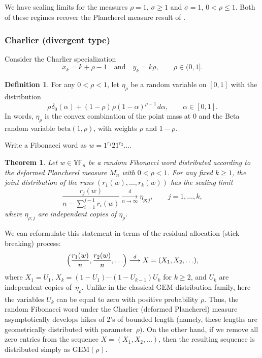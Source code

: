 \documentclass[letterpaper,11pt,oneside,reqno]{article}
\numberwithin{equation}{section}
\newcommand{\ssp}{\hspace{1pt}}
\newtheorem{theorem}[proposition]{Theorem}
\theoremstyle{definition}
\newtheorem{definition}[proposition]{Definition}
\begin{document}
\subsection{}

We have scaling limits for the measures
$\rho=1$, $\sigma\ge1$
and
$\sigma=1$, $0<\rho\le 1$.
Both of these regimes recover the Plancherel measure
result of \cite{gnedin2000plancherel}.

\subsubsection{Charlier (divergent type)}

Consider the Charlier specialization
\begin{equation}
	x_k = k + \rho - 1 \quad \text{and} \quad y_k = k \rho ,\qquad  \rho \in (0, 1].
\end{equation}

\begin{definition}
	For any $0<\rho<1$,
	let $\eta_{\rho}$ be a random variable on $[0,1]$ with the distribution
	\begin{equation}
			\rho \ssp\delta_0(\alpha) + (1 - \rho)\ssp \rho (1 - \alpha)^{\rho - 1} \ssp d\alpha,\qquad
			\alpha\in[0,1].
	\end{equation}
	In words, $\eta_\rho$ is
	the convex combination of the point mass at $0$ and the Beta
	random variable $\mathrm{beta}(1, \rho)$, with weights
	$\rho$ and $1 - \rho$.
\end{definition}

Write a Fibonacci word as $w=1^{r_1}21^{r_2}\ldots $.

\begin{theorem}
	Let $w\in \mathbb{YF}_n$ be a random Fibonacci word distributed
	according to the deformed Plancherel measure $M_n$ with $0<\rho<1$.
	For any fixed $k\ge 1$, the joint distribution of the
	runs $(r_1(w), \ldots, r_k(w))$ has the scaling limit
	\begin{equation*}
		\frac{r_j(w)}{n-\sum_{i=1}^{j-1}r_i(w)}\xrightarrow[n\to\infty]{d}\eta_{\rho;j},\qquad j=1,\ldots,k,
	\end{equation*}
	where $\eta_{\rho;j}$ are independent copies of $\eta_\rho$.
\end{theorem}

We can
reformulate
this statement
in terms of the
residual allocation (stick-breaking) process:
\begin{equation*}
	\Bigl( \frac{r_1(w)}{n}, \frac{r_2(w)}{n}, \ldots \Bigr)
	\stackrel{d}{\longrightarrow}
	X=(X_1,X_2,\ldots ),
\end{equation*}
where $X_1=U_1$, $X_k=(1-U_1)\cdots (1-U_{k-1})U_k $ for $k\ge2$, and $U_k$
are independent copies of~$\eta_\rho$.
Unlike in the classical $\mathrm{GEM}$ distribution family, here
the variables $U_k$ can be equal to zero with positive probability $\rho$.
Thus, the random Fibonacci word
under the Charlier (deformed Plancherel) measure asymptotically
develops hikes of 2's of bounded length
(namely, these lengths are geometrically distributed with parameter~$\rho)$.
On the other hand, if we remove all
zero entries from the sequence
$X=(X_1,X_2,\ldots )$, then the resulting sequence is
distributed simply as $\mathrm{GEM}(\rho)$.
\end{document}
